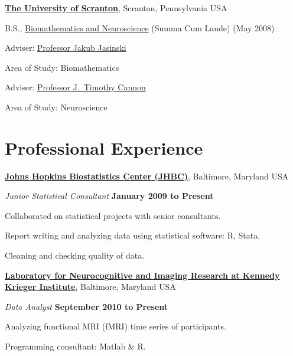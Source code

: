 \documentclass[11pt,a4paper]{moderncv}
\begin{document}
\href{http://www.scranton.edu/}{\textbf{The University of Scranton}},
Scranton, Pennsylvania USA
\begin{outerlist}

\item[] B.S.,
        \href{http://math.scranton.edu/}
             {Biomathematics and Neuroscience}
            (Summa Cum Laude) (May 2008)
        \begin{innerlist}
        \item Adviser:
              \href{http://academic.scranton.edu/department/math/Faculty/inf_jasi.html}
                   {Professor Jakub Jasinski}
        \item Area of Study: Biomathematics\\
        \item Adviser:
              \href{http://academic.scranton.edu/faculty/cannon/}
                   {Professor J.~Timothy Cannon}
        \item Area of Study: Neuroscience
        \end{innerlist}


\end{outerlist}

\section{ Professional Experience}
%
\href{http://www.biostat.jhsph.edu/consult/}{\textbf{Johns Hopkins Biostatistics Center (JHBC)}},
Baltimore, Maryland USA
\begin{outerlist}

\item[] \textit{Junior Statistical Consultant}%
        \hfill \textbf{January 2009 to Present}
\begin{innerlist}
\item Collaborated on statistical projects with senior consultants.
\item Report writing and analyzing data using statistical software: R, Stata.
\item Cleaning and checking quality of data.
\end{innerlist}
\end{outerlist}



\href{http://lnir.kennedykrieger.org/staff.html}{\textbf{Laboratory for Neurocognitive and Imaging Research at Kennedy Krieger Institute}},
Baltimore, Maryland USA
\begin{outerlist}

\item[] \textit{Data Analyst}%
        \hfill \textbf{September 2010 to Present}
\begin{innerlist}
\item Analyzing functional MRI (fMRI) time series of participants.
\item Programming consultant: Matlab \& R.  
\end{innerlist}
\end{outerlist}
\end{document}
